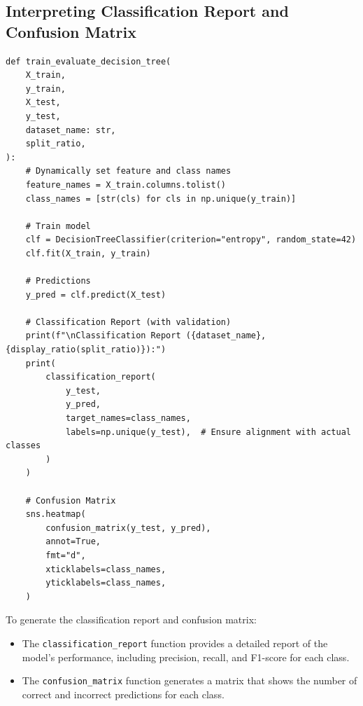 \subsection{Interpreting Classification Report and Confusion Matrix}
\begin{verbatim}
def train_evaluate_decision_tree(
    X_train,
    y_train,
    X_test,
    y_test,
    dataset_name: str,
    split_ratio,
):
    # Dynamically set feature and class names
    feature_names = X_train.columns.tolist()
    class_names = [str(cls) for cls in np.unique(y_train)]

    # Train model
    clf = DecisionTreeClassifier(criterion="entropy", random_state=42)
    clf.fit(X_train, y_train)

    # Predictions
    y_pred = clf.predict(X_test)

    # Classification Report (with validation)
    print(f"\nClassification Report ({dataset_name}, {display_ratio(split_ratio)}):")
    print(
        classification_report(
            y_test,
            y_pred,
            target_names=class_names,
            labels=np.unique(y_test),  # Ensure alignment with actual classes
        )
    )

    # Confusion Matrix
    sns.heatmap(
        confusion_matrix(y_test, y_pred),
        annot=True,
        fmt="d",
        xticklabels=class_names,
        yticklabels=class_names,
    )
\end{verbatim}
\begin{flushleft}
	To generate the classification report and confusion matrix:
	\begin{itemize}
		\item The \texttt{classification\_report} function provides a detailed report of the model's performance, including precision, recall, and F1-score for each class.
		\item The \texttt{confusion\_matrix} function generates a matrix that shows the number of correct and incorrect predictions for each class.
	\end{itemize}
\end{flushleft}

